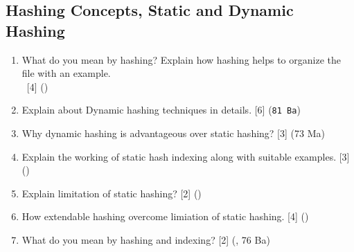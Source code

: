 \documentclass[12pt]{article}
\newcommand{\enter}{\\\textcolor{white}{1}}
\begin{document}
    \subsection{Hashing Concepts, Static and Dynamic Hashing}
    		\begin{enumerate}[noitemsep, topsep = 0pt]
    			\item What do you mean by hashing? Explain how hashing helps to organize the file with an example.
    			\enter\hfill [4] ()
    			
    			\item Explain about Dynamic hashing techniques in details. \hfill [6] (\texttt{81 Ba})
    			
    			\item Why dynamic hashing is advantageous over static hashing? \hfill [3] (73 Ma)
    			
    			\item Explain the working of static hash indexing along with suitable examples. \hfill [3] ()
    			
    			\item Explain limitation of static hashing? \hfill [2] ()
    			
			\item How extendable hashing overcome limiation of static hashing. \hfill [4] ()
			    			
    			\item What do you mean by hashing and indexing? \hfill [2] (, 76 Ba)
    		\end{enumerate}
    		
\end{document}
